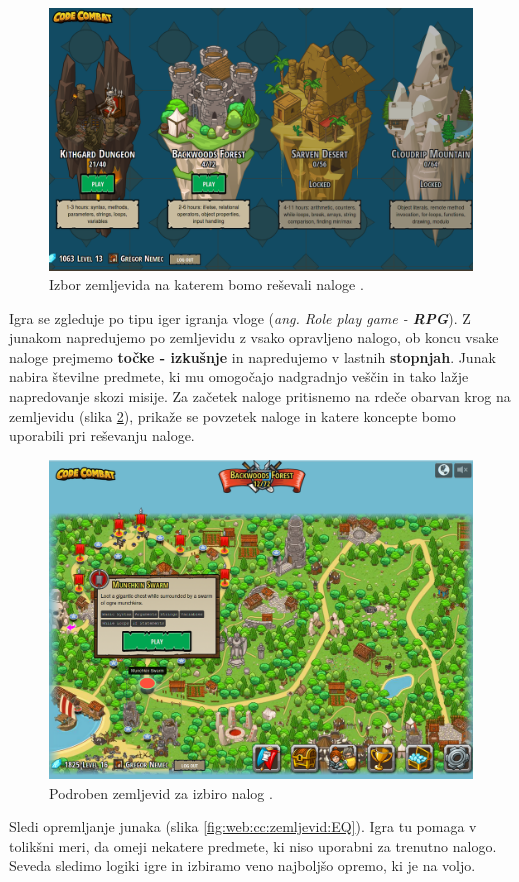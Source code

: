 \begin{figure}[h!]
  \centering
    \includegraphics [width=0.65\linewidth, keepaspectratio =
   1] {./images/sc_web/cc_izbor-zem-v01.png}
   \caption{Izbor zemljevida na katerem bomo reševali naloge
     \cite{web:codecombat}.}
   \label{fig:web:cc:zemljevid}
 \end{figure}

 Igra se zgleduje po tipu iger igranja vloge (\emph{ang. Role play
   game - \textbf{RPG}}). Z junakom napredujemo po zemljevidu z vsako
 opravljeno nalogo, ob koncu vsake naloge prejmemo \textbf{točke -
   izkušnje} in napredujemo v lastnih \textbf{stopnjah}. Junak nabira
 številne predmete, ki mu omogočajo nadgradnjo veščin in tako lažje
 napredovanje skozi misije. Za začetek naloge pritisnemo na rdeče
 obarvan krog na zemljevidu (slika \ref{fig:web:cc:zemljevid:BG}),
 prikaže se povzetek naloge in katere koncepte bomo uporabili pri
 reševanju naloge. 

\begin{figure}[h!]
  \centering
    \includegraphics [width=0.65\linewidth, keepaspectratio =
   1] {./images/sc_web/cc_izbor-zem-BG-v01.png}
   \caption{Podroben zemljevid za izbiro nalog \cite{web:codecombat}.}
   \label{fig:web:cc:zemljevid:BG}
 \end{figure}

 Sledi opremljanje junaka (slika \ref{fig:web:cc:zemljevid:EQ}). Igra
 tu pomaga v tolikšni meri, da omeji nekatere predmete, ki niso
 uporabni za trenutno nalogo. Seveda sledimo logiki igre in izbiramo
 veno najboljšo opremo, ki je na voljo.
 

